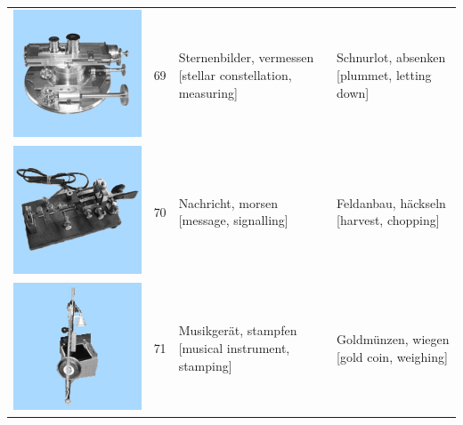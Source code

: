 \documentclass[
  english,
  man,floatsintext]{apa7}
\begin{document}
\begin{center}
\begin{ThreePartTable}
{\begin{longtable}{llll}
\includegraphics[valign=c, scale=0.23]{../materials/unfamiliar/69.png} & 69 & \makecell[l]{Sternenbilder, vermessen\\{[stellar constellation, measuring]}} & \makecell[l]{Schnurlot, absenken\\{[plummet, letting down]}}\\
\includegraphics[valign=c, scale=0.23]{../materials/unfamiliar/70.png} & 70 & \makecell[l]{Nachricht, morsen\\{[message, signalling]}} & \makecell[l]{Feldanbau, häckseln\\{[harvest, chopping]}}\\
\includegraphics[valign=c, scale=0.23]{../materials/unfamiliar/71.png} & 71 & \makecell[l]{Musikgerät, stampfen\\{[musical instrument, stamping]}} & \makecell[l]{Goldmünzen, wiegen\\{[gold coin, weighing]}}\\

\end{longtable}}
\end{ThreePartTable}
\end{center}
\end{document}
